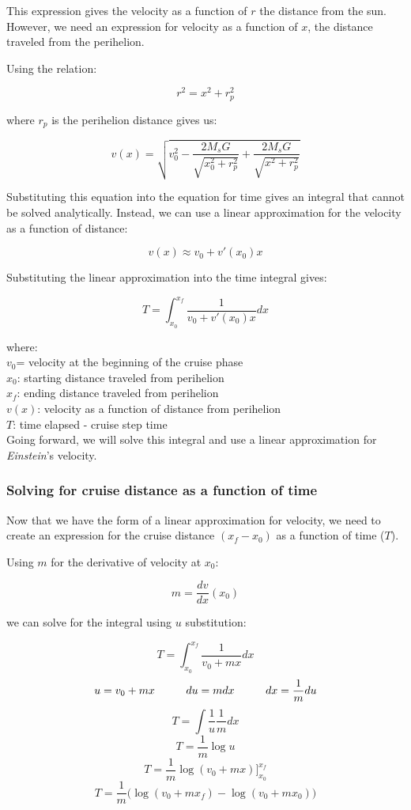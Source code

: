 \documentclass[12pt]{article} %
\begin{document}
This expression gives the velocity as a function of $r$ the distance from the sun. However, we need an expression for velocity as a function of $x$, the distance traveled from the perihelion. 

Using the relation:

$$r^2 = x^2 + r_p^2$$

where $r_p$ is the perihelion distance gives us:

$$v(x) = \sqrt{v_0^2-\frac{2M_sG}{\sqrt{x_0^2 + r_p^2}} + \frac{2M_sG}{\sqrt{x^2 + r_p^2}}}$$

Substituting this equation into the equation for time gives an integral that cannot be solved analytically. Instead, we can use a linear approximation for the velocity as a function of distance:

$$v(x) \approx v_0 + v'(x_0)x$$

Substituting the linear approximation into the time integral gives:

$$\boxed{T = \int_{x_0}^{x_f} \frac{1}{v_0+v'(x_0)x} dx}$$

where:\\
$v_0$= velocity at the beginning of the cruise phase\\
$x_0$: starting distance traveled from perihelion\\
$x_f$: ending distance traveled from perihelion\\
$v(x)$: velocity as a function of distance from perihelion\\
$T$: time elapsed - cruise step time\\

Going forward, we will solve this integral and use a linear approximation for \textit{Einstein}'s velocity.

\subsubsection{Solving for cruise distance as a function of time}

Now that we have the form of a linear approximation for velocity, we need to create an expression for the cruise distance $(x_f-x_0)$ as a function of time ($T$).

Using $m$ for the derivative of velocity at $x_0$:

$$m = \frac{dv}{dx}(x_0)$$

we can solve for the integral using $u$ substitution:

$$T = \int_{x_0}^{x_f} \frac{1}{v_0+mx} dx$$
$$u = v_0+mx\hspace{10mm}du = mdx\hspace{10mm}dx = \frac{1}{m}du$$
$$T = \int \frac{1}{u} \frac{1}{m}dx$$
$$T = \frac{1}{m} \log{u}$$
$$T = \frac{1}{m} \log{(v_0+mx)}\bigg]_{x_0}^{x_f}$$
$$T = \frac{1}{m} \bigg(\log{(v_0+mx_f)} - \log{(v_0+mx_0)}\bigg)$$
\end{document}
